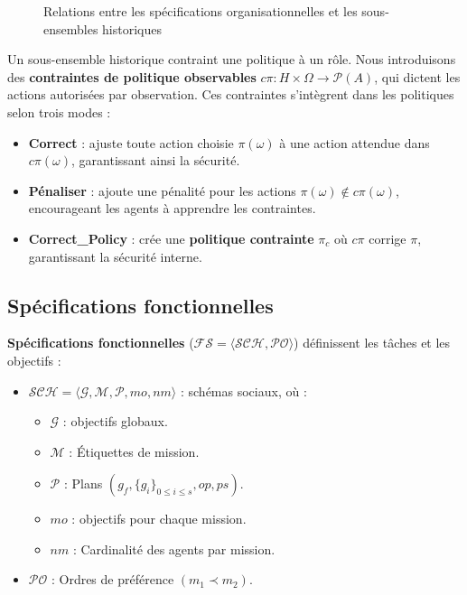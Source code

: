 \begin{figure}[h!]
  \centering
  
  \caption{Relations entre les spécifications organisationnelles et les sous-ensembles historiques}
  \label{fig:PRAHOM_osm_rels}
\end{figure}

Un sous-ensemble historique contraint une politique à un rôle. Nous introduisons des \textbf{contraintes de politique observables} $c\pi: H \times \Omega \rightarrow \mathcal{P}(A)$, qui dictent les actions autorisées par observation. Ces contraintes s'intègrent dans les politiques selon trois modes :
\begin{itemize}
  \item \textbf{Correct} : ajuste toute action choisie $\pi(\omega)$ à une action attendue dans $c\pi(\omega)$, garantissant ainsi la sécurité.
  \item \textbf{Pénaliser} : ajoute une pénalité pour les actions $\pi(\omega) \notin c\pi(\omega)$, encourageant les agents à apprendre les contraintes.
  \item \textbf{Correct\_Policy} : crée une \textbf{politique contrainte} $\pi_c$ où $c\pi$ corrige $\pi$, garantissant la sécurité interne.
\end{itemize}

\subsection{Spécifications fonctionnelles}

\textbf{Spécifications fonctionnelles} ($\mathcal{FS} = \langle \mathcal{SCH}, \mathcal{PO} \rangle$) définissent les tâches et les objectifs :
\begin{itemize}
  \item $\mathcal{SCH} = \langle \mathcal{G}, \mathcal{M}, \mathcal{P}, mo, nm \rangle$ : schémas sociaux, où :
        \begin{itemize}
          \item $\mathcal{G}$ : objectifs globaux.
          \item $\mathcal{M}$ : Étiquettes de mission.
          \item $\mathcal{P}$ : Plans $(g_f, \{g_i\}_{0 \leq i \leq s}, op, ps)$.
          \item $mo$ : objectifs pour chaque mission.
          \item $nm$ : Cardinalité des agents par mission.
        \end{itemize}
  \item $\mathcal{PO}$ : Ordres de préférence $(m_1 \prec m_2)$.
\end{itemize}

